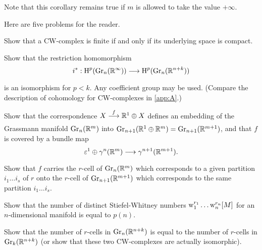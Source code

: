 \documentclass[../main]{subfiles}
\begin{document}
Note that this corollary remains true if $m$ is allowed to take the value $+\infty$.\medskip

Here are five problems for the reader.
\begin{problem}
\label{prob:06.01}
Show that a CW-complex is finite if and only if its underlying space is compact.
\end{problem}
\begin{problem}\label{prob-6-B}
Show that the restriction homomorphism
\[
i^\ast : \homology^{p}(\grassmannian_{n}(\bR^{\infty}))\varrightarrow{} \homology^{p}(\grassmannian_{n}(\bR^{n+k}))
\]
is an isomorphism for $p<k$. Any coefficient group may be used. (Compare the description of cohomology for CW-complexes in \ref{app:A}.)
\end{problem}
\begin{problem}
\label{prob:06.03}
Show that the correspondence $X \varrightarrow{f} \bR^{1} \oplus X$ defines an embedding of the Grassmann manifold $\operatorname{Gr}_{n}(\mathbb R^m)$ into $\operatorname{Gr}_{n+1}(\mathbb R^{1} \oplus \mathbb R^{m})=\operatorname{Gr}_{n+1}(\mathbb R^{m+1})$, and that $f$ is covered by a bundle map
\[
\trivialbundle^{1} \oplus \tautological^{n}(\bR^m) \varrightarrow{} \tautological^{n+1}(\bR^{m+1}).
\]
Show that $f$ carries the $r$-cell of $\operatorname{Gr}_{n}(\mathbb R^{m})$ which corresponds to a given partition $i_{1}\dots i_{s}$ of $r$ onto the $r$-cell of $\operatorname{Gr}_{n+1}(\mathbb R^{m+1})$ which corresponds to the same partition $i_{1}\dots i_{s}$.
\end{problem}
\begin{problem}
\label{prob:06.04}
Show that the number of distinct Stiefel-Whitney numbers $\operatorname{w}_{1}^{r_{1}}\dots \operatorname{w}_{n}^{r_{n}}[M]$ for an $n$-dimensional manifold is equal to $p(n)$.
\end{problem} 
\begin{problem}
\label{prob:06.05}
Show that the number of $r$-cells in $\operatorname{Gr}_{n}(\mathbb R^{n+k})$ is equal to the number of $r$-cells in $\operatorname{Gr}_{k}(\mathbb R^{n+k})$ (or show that these two CW-complexes are actually isomorphic).
\end{problem}
\end{document}
